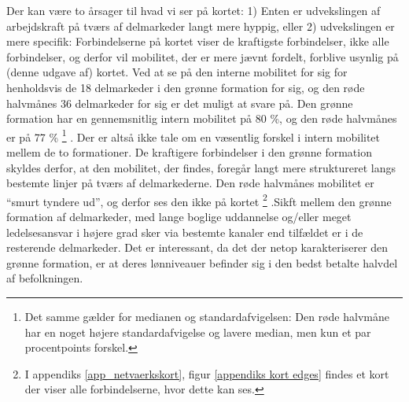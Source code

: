Der kan være to årsager til hvad vi ser på kortet: 1) Enten er udvekslingen af arbejdskraft på tværs af delmarkeder langt mere hyppig, eller 2) udvekslingen er mere specifik: Forbindelserne på kortet viser de kraftigste forbindelser, ikke alle forbindelser, og derfor vil mobilitet, der er mere jævnt fordelt, forblive usynlig på (denne udgave af) kortet. Ved at se på den interne mobilitet for sig for henholdsvis de 18 delmarkeder i den grønne formation for sig, og den røde halvmånes 36 delmarkeder for sig er det muligt at svare på. Den grønne formation har en gennemsnitlig intern mobilitet på 80 \%, og den røde halvmånes er på 77 \%%
%
  \footnote{ Det samme gælder for medianen og standardafvigelsen: Den røde halvmåne har en noget højere standardafvigelse og lavere median, men kun et par procentpoints forskel.}%
%
. Der er altså ikke tale om en væsentlig forskel i intern mobilitet mellem de to formationer. De kraftigere forbindelser i den grønne formation skyldes derfor, at den mobilitet, der findes, foregår langt mere struktureret langs bestemte linjer på tværs af delmarkederne. Den røde halvmånes mobilitet er “smurt tyndere ud”, og derfor ses den ikke på kortet%
%
 \footnote{ I appendiks \ref{app_netvaerkskort}, figur \ref{appendiks kort edges} findes et kort der viser alle forbindelserne, hvor dette kan ses.}%
%
.Sikft mellem den grønne formation af delmarkeder, med lange boglige uddannelse og/eller meget ledelsesansvar i højere grad sker via bestemte kanaler end tilfældet er i de resterende delmarkeder. Det er interessant, da det der netop karakteriserer den grønne formation, er at deres lønniveauer befinder sig i den bedst betalte halvdel af befolkningen. 

